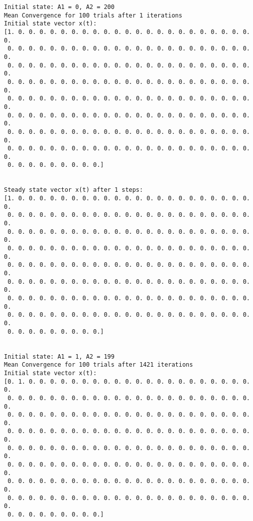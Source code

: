 \documentclass[11pt]{article}
\begin{document}
    \begin{Verbatim}[commandchars=\\\{\}]
Initial state: A1 = 0, A2 = 200
Mean Convergence for 100 trials after 1 iterations
Initial state vector x(t):
[1. 0. 0. 0. 0. 0. 0. 0. 0. 0. 0. 0. 0. 0. 0. 0. 0. 0. 0. 0. 0. 0. 0. 0.
 0. 0. 0. 0. 0. 0. 0. 0. 0. 0. 0. 0. 0. 0. 0. 0. 0. 0. 0. 0. 0. 0. 0. 0.
 0. 0. 0. 0. 0. 0. 0. 0. 0. 0. 0. 0. 0. 0. 0. 0. 0. 0. 0. 0. 0. 0. 0. 0.
 0. 0. 0. 0. 0. 0. 0. 0. 0. 0. 0. 0. 0. 0. 0. 0. 0. 0. 0. 0. 0. 0. 0. 0.
 0. 0. 0. 0. 0. 0. 0. 0. 0. 0. 0. 0. 0. 0. 0. 0. 0. 0. 0. 0. 0. 0. 0. 0.
 0. 0. 0. 0. 0. 0. 0. 0. 0. 0. 0. 0. 0. 0. 0. 0. 0. 0. 0. 0. 0. 0. 0. 0.
 0. 0. 0. 0. 0. 0. 0. 0. 0. 0. 0. 0. 0. 0. 0. 0. 0. 0. 0. 0. 0. 0. 0. 0.
 0. 0. 0. 0. 0. 0. 0. 0. 0. 0. 0. 0. 0. 0. 0. 0. 0. 0. 0. 0. 0. 0. 0. 0.
 0. 0. 0. 0. 0. 0. 0. 0. 0.]


Steady state vector x(t) after 1 steps:
[1. 0. 0. 0. 0. 0. 0. 0. 0. 0. 0. 0. 0. 0. 0. 0. 0. 0. 0. 0. 0. 0. 0. 0.
 0. 0. 0. 0. 0. 0. 0. 0. 0. 0. 0. 0. 0. 0. 0. 0. 0. 0. 0. 0. 0. 0. 0. 0.
 0. 0. 0. 0. 0. 0. 0. 0. 0. 0. 0. 0. 0. 0. 0. 0. 0. 0. 0. 0. 0. 0. 0. 0.
 0. 0. 0. 0. 0. 0. 0. 0. 0. 0. 0. 0. 0. 0. 0. 0. 0. 0. 0. 0. 0. 0. 0. 0.
 0. 0. 0. 0. 0. 0. 0. 0. 0. 0. 0. 0. 0. 0. 0. 0. 0. 0. 0. 0. 0. 0. 0. 0.
 0. 0. 0. 0. 0. 0. 0. 0. 0. 0. 0. 0. 0. 0. 0. 0. 0. 0. 0. 0. 0. 0. 0. 0.
 0. 0. 0. 0. 0. 0. 0. 0. 0. 0. 0. 0. 0. 0. 0. 0. 0. 0. 0. 0. 0. 0. 0. 0.
 0. 0. 0. 0. 0. 0. 0. 0. 0. 0. 0. 0. 0. 0. 0. 0. 0. 0. 0. 0. 0. 0. 0. 0.
 0. 0. 0. 0. 0. 0. 0. 0. 0.]


Initial state: A1 = 1, A2 = 199
Mean Convergence for 100 trials after 1421 iterations
Initial state vector x(t):
[0. 1. 0. 0. 0. 0. 0. 0. 0. 0. 0. 0. 0. 0. 0. 0. 0. 0. 0. 0. 0. 0. 0. 0.
 0. 0. 0. 0. 0. 0. 0. 0. 0. 0. 0. 0. 0. 0. 0. 0. 0. 0. 0. 0. 0. 0. 0. 0.
 0. 0. 0. 0. 0. 0. 0. 0. 0. 0. 0. 0. 0. 0. 0. 0. 0. 0. 0. 0. 0. 0. 0. 0.
 0. 0. 0. 0. 0. 0. 0. 0. 0. 0. 0. 0. 0. 0. 0. 0. 0. 0. 0. 0. 0. 0. 0. 0.
 0. 0. 0. 0. 0. 0. 0. 0. 0. 0. 0. 0. 0. 0. 0. 0. 0. 0. 0. 0. 0. 0. 0. 0.
 0. 0. 0. 0. 0. 0. 0. 0. 0. 0. 0. 0. 0. 0. 0. 0. 0. 0. 0. 0. 0. 0. 0. 0.
 0. 0. 0. 0. 0. 0. 0. 0. 0. 0. 0. 0. 0. 0. 0. 0. 0. 0. 0. 0. 0. 0. 0. 0.
 0. 0. 0. 0. 0. 0. 0. 0. 0. 0. 0. 0. 0. 0. 0. 0. 0. 0. 0. 0. 0. 0. 0. 0.
 0. 0. 0. 0. 0. 0. 0. 0. 0.]



\end{Verbatim}
\end{document}
